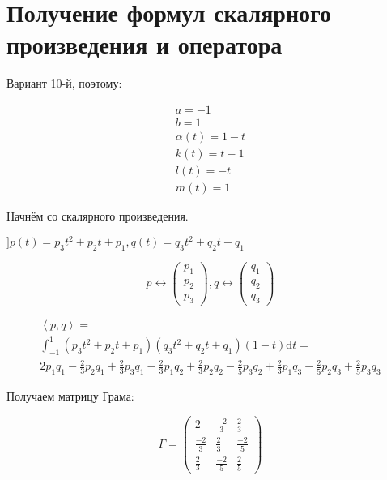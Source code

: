 \documentclass[12pt, a4paper]{article}
\begin{document}
    \section{Получение формул скалярного произведения и оператора}

    Вариант 10-й, поэтому:

    \begin{gather*}
        a = -1 \\
        b = 1 \\
        \alpha(t) = 1 - t \\
        k(t) = t - 1 \\
        l(t) = -t \\
        m(t) = 1
    \end{gather*}

    Начнём со скалярного произведения. 

    $] p(t) = p_3 t^2 + p_2 t + p_1, 
    q(t) = q_3 t^2 + q_2 t + q_1$

    \begin{equation}
        p \leftrightarrow \begin{pmatrix}
            p_1 \\ p_2 \\ p_3
        \end{pmatrix}, 
        q \leftrightarrow \begin{pmatrix}
            q_1 \\ q_2 \\ q_3
        \end{pmatrix}
    \end{equation}

    \begin{multline}
        \left\langle p, q \right\rangle = \\
        \int_{-1}^{1} (p_3 t^2 + p_2 t + p_1)(q_3 t^2 + q_2 t + q_1) (1 - t) \mathrm{d}t = \\
        2 p_1 q_1 - \frac 23 p_2 q_1 + \frac 23 p_3 q_1 - \frac 23 p_1 q_2 + \frac 23 p_2 q_2 
        - \frac 25 p_3 q_2 + \frac 23 p_1 q_3 - \frac 25 p_2 q_3 + \frac 25 p_3 q_3
    \end{multline}

    Получаем матрицу Грама:

    \begin{equation}
        \Gamma = \left(\begin{matrix}
            2 & \frac{-2}{3} & \frac{2}{3} \\
            \frac{-2}{3} & \frac{2}{3} & \frac{-2}{5} \\
            \frac{2}{3} & \frac{-2}{5} & \frac{2}{5}
        \end{matrix}\right)
    \end{equation}
\end{document}
